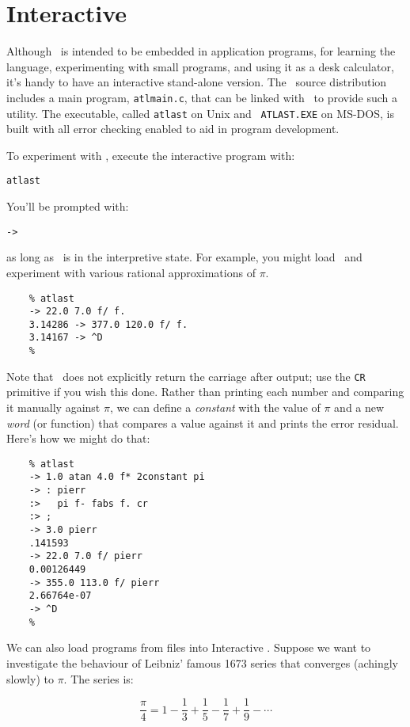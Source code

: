 \documentclass[twocolumn]{article}
\begin{document}
\section{Interactive \atlast}

Although \atlast\ is intended to be embedded in application programs,
for learning the language, experimenting with small programs, and
using it as a desk calculator, it's handy to have an interactive
stand-alone version.  The \atlast\ source distribution includes a main
program, {\tt atlmain.c}, that can be linked with \atlast\ to provide
such a utility.  The executable, called {\tt atlast} on Unix and {\tt
ATLAST.EXE} on MS-DOS, is built with all error checking enabled to aid
in program development.

To experiment with \atlast , execute the interactive program with:

{\tt atlast}

You'll be prompted with:

{\tt ->}

as long as \atlast\ is in the interpretive state.  For example, you
might load \atlast\ and experiment with various rational approximations
of $\pi$.

\begin{verbatim}
    % atlast
    -> 22.0 7.0 f/ f.
    3.14286 -> 377.0 120.0 f/ f.
    3.14167 -> ^D
    %
\end{verbatim}

Note that \atlast\ does not explicitly return the carriage after
output; use the {\tt CR} primitive if you wish this done.  Rather than
printing each number and comparing it manually against $\pi$, we can
define a {\em constant} with the value of $\pi$ and a new {\em word}
(or function) that compares a value against it and prints the error
residual.  Here's how we might do that:

\begin{verbatim}
    % atlast
    -> 1.0 atan 4.0 f* 2constant pi
    -> : pierr
    :>   pi f- fabs f. cr
    :> ;
    -> 3.0 pierr
    .141593
    -> 22.0 7.0 f/ pierr
    0.00126449
    -> 355.0 113.0 f/ pierr
    2.66764e-07
    -> ^D
    %
\end{verbatim}

We can also load programs from files into Interactive \atlast .
Suppose we want to investigate the behaviour of Leibniz' famous
1673 series that converges (achingly slowly) to $\pi$.  The series is:

\[ \frac{\pi}{4} = 1-\frac{1}{3}+\frac{1}{5}-\frac{1}{7}+\frac{1}{9}-
    \cdots \]
\end{document}
